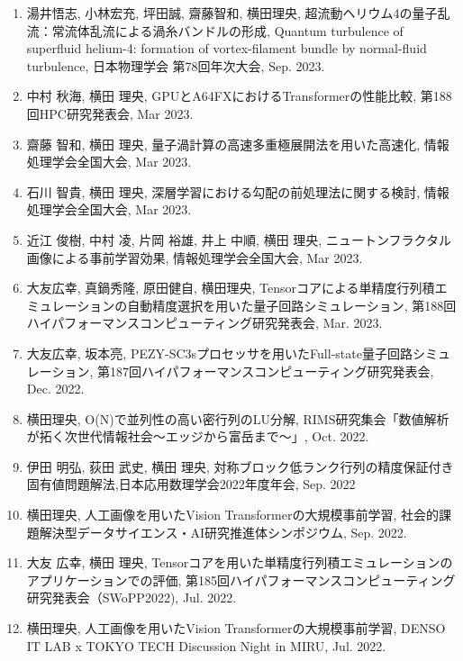\documentclass[margin,line]{cv}
\begin{document}
\begin{resume}
\begin{enumerate}
\item 湯井悟志, 小林宏充, 坪田誠, 齋藤智和, 横田理央, 超流動ヘリウム4の量子乱流：常流体乱流による渦糸バンドルの形成, Quantum turbulence of superfluid helium-4: formation of vortex-filament bundle by normal-fluid turbulence, 日本物理学会 第78回年次大会, Sep. 2023.

\item 中村 秋海, 横田 理央, GPUとA64FXにおけるTransformerの性能比較, 第188回HPC研究発表会, Mar 2023.

\item 齋藤 智和, 横田 理央, 量子渦計算の高速多重極展開法を用いた高速化, 情報処理学会全国大会, Mar 2023.

\item 石川 智貴, 横田 理央, 深層学習における勾配の前処理法に関する検討, 情報処理学会全国大会, Mar 2023.

\item 近江 俊樹, 中村 凌, 片岡 裕雄, 井上 中順, 横田 理央, ニュートンフラクタル画像による事前学習効果, 情報処理学会全国大会, Mar 2023.

\item 大友広幸, 真鍋秀隆, 原田健自, 横田理央, Tensorコアによる単精度行列積エミュレーションの自動精度選択を用いた量子回路シミュレーション, 第188回ハイパフォーマンスコンピューティング研究発表会, Mar. 2023.

\item 大友広幸, 坂本亮, PEZY-SC3sプロセッサを用いたFull-state量子回路シミュレーション, 第187回ハイパフォーマンスコンピューティング研究発表会, Dec. 2022.

\item 横田理央, O(N)で並列性の高い密行列のLU分解, RIMS研究集会「数値解析が拓く次世代情報社会～エッジから富岳まで～」, Oct. 2022.

\item 伊田 明弘, 荻田 武史, 横田 理央, 対称ブロック低ランク行列の精度保証付き固有値問題解法,日本応用数理学会2022年度年会, Sep. 2022

\item 横田理央, 人工画像を用いたVision Transformerの大規模事前学習, 社会的課題解決型データサイエンス・AI研究推進体シンポジウム, Sep. 2022.

\item 大友 広幸, 横田 理央, Tensorコアを用いた単精度行列積エミュレーションのアプリケーションでの評価, 第185回ハイパフォーマンスコンピューティング研究発表会（SWoPP2022), Jul. 2022.

\item 横田理央, 人工画像を用いたVision Transformerの大規模事前学習, DENSO IT LAB x TOKYO TECH Discussion Night in MIRU, Jul. 2022.


\end{enumerate}
\end{resume}
\end{document}
